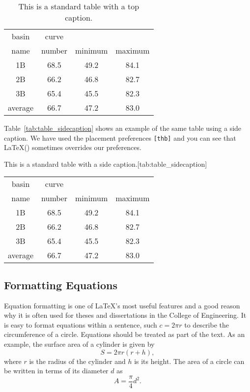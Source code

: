 \begin{table}[hbt]
	\centering
	\caption{This is a standard table with a top caption.}
	\label{tab:table_example}	
	\begin{tabular}{ c c c c}
		\toprule
		basin & curve \\
		name & number & minimum & maximum \\
		\midrule
		1B & 68.5 & 49.2 & 84.1 \\ 
		2B & 66.2 & 46.8 & 82.7\\ 
		3B & 65.4 & 45.5 & 82.3\\
		\midrule
		average & 66.7 & 47.2 & 83.0\\
		\bottomrule
	\end{tabular}
\end{table}

Table~\ref{tab:table_sidecaption} shows an example of the same table using a side caption. We have used the placement preferences \verb|[thb]| and you can see that \LaTeX() sometimes overrides our preferences.
\begin{table}[thb]
	\begin{sidecaption}{This is a standard table with a side caption.}[tab:table_sidecaption]
		\centering
		\begin{tabular}{ c c c c}
			\toprule
			basin & curve \\
			name & number & minimum & maximum \\
			\midrule
			1B & 68.5 & 49.2 & 84.1 \\ 
			2B & 66.2 & 46.8 & 82.7\\ 
			3B & 65.4 & 45.5 & 82.3\\
			\midrule
			average & 66.7 & 47.2 & 83.0\\
			\bottomrule
		\end{tabular}
	\end{sidecaption}
\end{table}

\subsection{Formatting Equations}
Equation formatting is one of \LaTeX's most useful features and a good reason why it is often used for theses and dissertations in the College of Engineering. It is easy to format equations within a sentence, such $c = 2 \pi r$ to describe the circumference of a circle. Equations should be treated as part of the text. As an example, the surface area of a cylinder is given by 
\begin{equation}
	\label{eq:surface_area_cyl}
	S = 2\pi r \left( r + h \right) , 
\end{equation}
where $r$ is the radius of the cylinder and $h$ is its height. The area of a circle can be written in terms of its diameter $d$ as 
\begin{equation}
	\label{eq:area_circle}
	A = \frac{\pi}{4} d^2 .
\end{equation}

